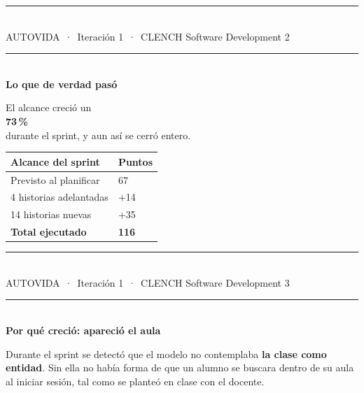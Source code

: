 \documentclass[11pt]{article}
\newcommand{\titulo}[1]{%
  {\color{cian}\rule{2.2cm}{2.2pt}}\\[0.30cm]
  {\fontsize{21}{24}\selectfont\bfseries\color{tinta} #1}\\[0.45cm]}
\newcommand{\tituloclaro}[1]{%
  {\color{cian}\rule{2.2cm}{2.2pt}}\\[0.30cm]
  {\fontsize{21}{24}\selectfont\bfseries\color{white} #1}\\[0.45cm]}
\newcommand{\pie}[1]{%
  \vfill
  {\color{linea}\rule{\textwidth}{0.4pt}}\\[0.12cm]
  {\footnotesize\color{grisclaro} AUTOVIDA\, ·\, Iteración 1\, ·\, CLENCH Software Development
   \hfill #1}}
\newcommand{\pieclaro}[1]{%
  \vfill
  {\color{cianoscuro}\rule{\textwidth}{0.4pt}}\\[0.12cm]
  {\footnotesize\color{gris} AUTOVIDA\, ·\, Iteración 1\, ·\, CLENCH Software Development
   \hfill #1}}
\begin{document}
\pie{2}
\newpage

\pagecolor{tinta}
\tituloclaro{Lo que de verdad pasó}
\vfill

\vspace{0.3cm}

\begin{minipage}[b]{0.46\textwidth}
{\large\color{grisclaro} El alcance creció un}\\[0.2cm]
{\fontsize{76}{78}\selectfont\bfseries\color{magenta} 73\,\%}\\[0.4cm]
{\large\color{white} durante el sprint, y aun así se cerró entero.}
\end{minipage}%
\hfill
\begin{minipage}[b]{0.48\textwidth}
{\small
{}
\begin{tabularx}{\textwidth}{@{}L>{\raggedleft\arraybackslash}p{2.6cm}@{}}
\hline
{\color{white}\textbf{Alcance del sprint}} & {\color{white}\textbf{Puntos}}\\
\hline
{\color{grisclaro}Previsto al planificar} & {\color{white}67}\\
{\color{grisclaro}4 historias adelantadas} & {\color{white}+14}\\
{\color{grisclaro}14 historias nuevas} & {\color{white}+35}\\
\hline
{\color{white}\textbf{Total ejecutado}} & {\color{magenta}\textbf{116}}\\
\hline
\end{tabularx}}
\end{minipage}

\pieclaro{3}
\newpage

\pagecolor{white}
\titulo{Por qué creció: apareció el aula}
\vfill

Durante el sprint se detectó que el modelo no contemplaba \textbf{la clase como entidad}. Sin ella no había forma de que un alumno se buscara dentro de su aula al iniciar sesión, tal como se planteó en clase con el docente.

\vspace{0.55cm}
\end{document}
